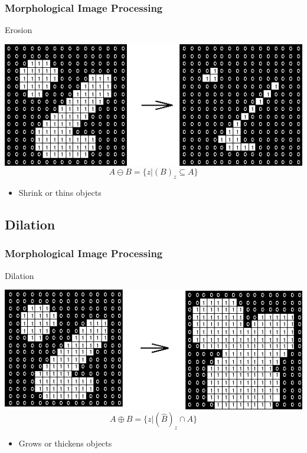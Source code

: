 \documentclass{beamer}
\begin{document}
\begin{frame}
\frametitle{Morphological Image Processing}
\begin{block}{Erosion}\scriptsize
  \begin{center}
    \includegraphics[height=0.2\textheight]{images/erosion.png}
    $$A \ominus B = \lbrace z |(B)_z \subseteq A \rbrace$$
  \end{center}
  \begin{itemize}
    \item Shrink or thins objects
  \end{itemize}
\end{block}
\end{frame}

\subsection{Dilation}

\begin{frame}
\frametitle{Morphological Image Processing}
\begin{block}{Dilation}\scriptsize
  \begin{center}
    \includegraphics[height=0.2\textheight]{images/dilation.png}
    $$A \oplus B = \lbrace z |(\hat{B})_z \cap A \rbrace$$
  \end{center}  
  \begin{itemize}
    \item Grows or thickens objects
  \end{itemize}
\end{block}
\end{frame}
\end{document}
